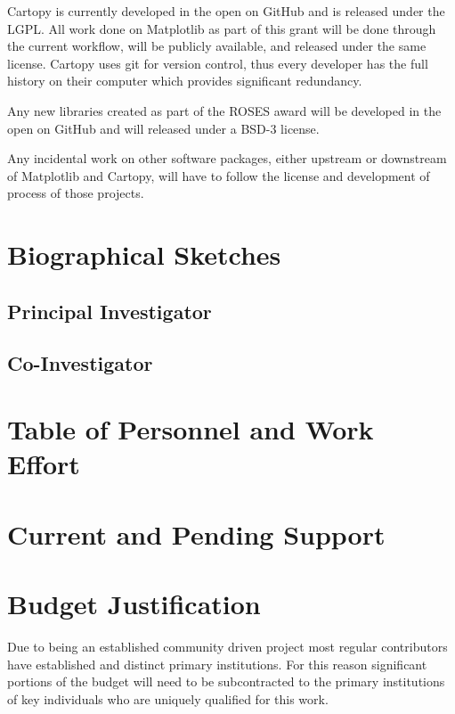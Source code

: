 \documentclass[12pt]{article}
\numberwithin{page}{section}
\begin{document}
Cartopy is currently developed in the open on GitHub and is released
under the LGPL.  All work done on Matplotlib as part of this grant
will be done through the current workflow, will be publicly available,
and released under the same license. Cartopy uses git for version
control, thus every developer has the full history on their computer
which provides significant redundancy.


Any new libraries created as part of the ROSES award will be developed
in the open on GitHub and will released under a BSD-3 license.

Any incidental work on other software packages, either upstream or
downstream of Matplotlib and Cartopy, will have to follow the license
and development of process of those projects.


\newpage
\section{Biographical Sketches}
\setcounter{page}{1}
\subsection{Principal Investigator}
\newpage
\subsection{Co-Investigator}

\newpage
\section{Table of Personnel and Work Effort}
\setcounter{page}{1}

\newpage
\section{Current and Pending Support}
\setcounter{page}{1}

\newpage
\section{Budget Justification}
\setcounter{page}{1}

Due to being an established community driven project most regular
contributors have established and distinct primary institutions.  For
this reason significant portions of the budget will need to be
subcontracted to the primary institutions of key individuals who are
uniquely qualified for this work.
\end{document}
